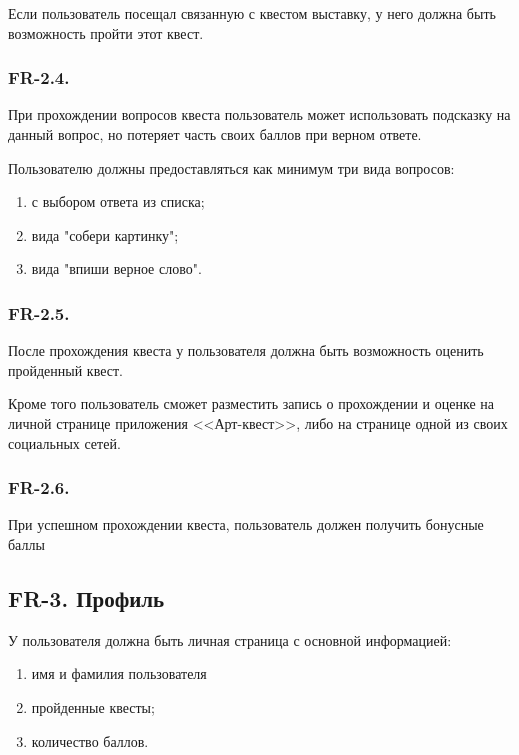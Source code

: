 		\hspace{10mm} Если пользователь посещал связанную с квестом выставку, у него должна быть возможность пройти этот квест.
		
		\subsubsection*{FR-2.4.}
		
			\hspace{10mm} При прохождении вопросов квеста пользователь может использовать подсказку на данный вопрос, но потеряет часть своих баллов при верном ответе.
			
			\hspace{10mm} Пользователю должны предоставляться как минимум три вида вопросов:
			\begin{enumerate}
				\item с выбором ответа из списка;
				\item вида "собери картинку";
				\item вида "впиши верное слово".
			\end{enumerate}
		
		\subsubsection*{FR-2.5.}
		
			\hspace{10mm} После прохождения квеста у пользователя должна быть возможность оценить пройденный квест.
		
			\hspace{10mm} Кроме того пользователь сможет разместить запись о прохождении и оценке на личной странице приложения <<Арт-квест>>, либо на странице одной из своих социальных сетей.
			
		\subsubsection*{FR-2.6.}
		
			\hspace{10mm} При успешном прохождении квеста, пользователь должен получить бонусные баллы
			
			
	\subsection*{FR-3. Профиль}
	
			\hspace{10mm} У пользователя должна быть личная страница с основной информацией:
			\begin{enumerate}
				\item имя и фамилия пользователя
				\item пройденные квесты;
				\item количество баллов.
			\end{enumerate}
		
